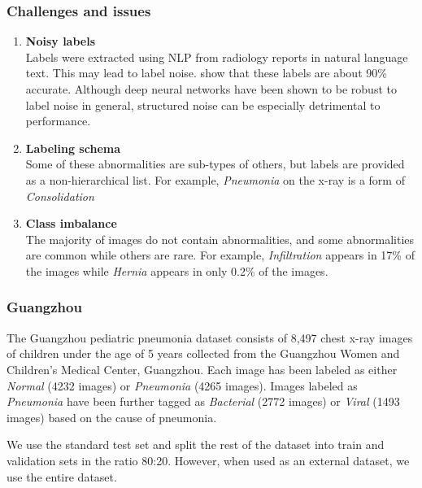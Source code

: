 \documentclass[8pt]{beamer}
\begin{document}
\begin{frame}
  \frametitle{Challenges and issues}
  \begin{enumerate}
  \item{\textbf{Noisy labels}\\
      Labels were extracted using NLP from radiology reports in natural language
      text. This may lead to label noise. \cite{Wang2017} show that these labels
      are about 90\% accurate. Although deep neural networks have been shown to
      be robust to label noise in general\cite{rolnick2017deep}, structured
      noise can be especially detrimental to performance.} \pause
  \item{\textbf{Labeling schema}\\
      Some of these abnormalities are sub-types of others, but labels are
      provided as a non-hierarchical list. For example, \emph{Pneumonia} on the
      x-ray is a form of \emph{Consolidation} } \pause
  \item{\textbf{Class imbalance}\\
      The majority of images do not contain abnormalities, and some
      abnormalities are common while others are rare. For example,
      \emph{Infiltration} appears in 17\% of the images while \emph{Hernia}
      appears in only 0.2\% of the images.}
  \end{enumerate}
\end{frame}

\begin{frame}
  \frametitle{Guangzhou} The Guangzhou pediatric pneumonia dataset consists of
  8,497 chest x-ray images of children under the age of 5 years collected from
  the Guangzhou Women and Children’s Medical Center, Guangzhou. Each image has
  been labeled as either \emph{Normal} (4232 images) or \emph{Pneumonia} (4265
  images). Images labeled as \emph{Pneumonia} have been further tagged as
  \emph{Bacterial} (2772 images) or \emph{Viral} (1493 images) based on the
  cause of pneumonia.\\ \pause

  \vspace{\baselineskip}

  We use the standard test set and split the rest of the dataset into train and
  validation sets in the ratio 80:20. However, when used as an external dataset,
  we use the entire dataset.
\end{frame}
\end{document}
